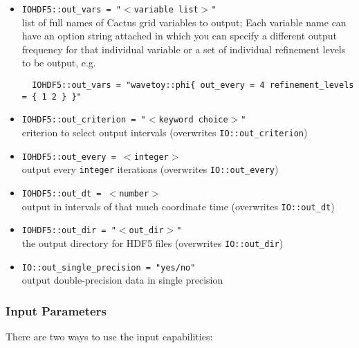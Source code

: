 \begin{itemize}
  \item {\tt IOHDF5::out\_vars = "$<$variable list$>$"}\\
        list of full names of Cactus grid variables to output;
        Each variable name can have an option string attached in which you
        can specify a different output frequency for that individual variable
	or a set of individual refinement levels to be output, e.g.
\begin{verbatim}
  IOHDF5::out_vars = "wavetoy::phi{ out_every = 4 refinement_levels = { 1 2 } }"
\end{verbatim}
  \item {\tt IOHDF5::out\_criterion = "$<$keyword choice$>$"}\\
        criterion to select output intervals (overwrites {\tt IO::out\_criterion})
  \item {\tt IOHDF5::out\_every = $<$integer$>$}\\
        output every {\tt integer} iterations (overwrites {\tt IO::out\_every})
  \item {\tt IOHDF5::out\_dt = $<$number$>$}\\
        output in intervals of that much coordinate time (overwrites {\tt IO::out\_dt})
  \item {\tt IOHDF5::out\_dir = "$<$out\_dir$>$"}\\
        the output directory for HDF5 files (overwrites {\tt IO::out\_dir})
  \item {\tt IO::out\_single\_precision = "yes/no"}\\
        output double-precision data in single precision
\end{itemize}

\subsubsection{Input Parameters}

There are two ways to use the input capabilities:

